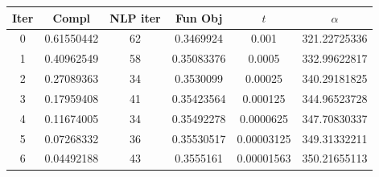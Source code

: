 \begin{tabular}{c c c c c c}
\toprule
Iter & Compl & NLP iter & Fun Obj & $t$ & $\alpha$ \\
\midrule
0 & 0.61550442 & 62 & 0.3469924 & 0.001 & 321.22725336 \\
1 & 0.40962549 & 58 & 0.35083376 & 0.0005 & 332.99622817 \\
2 & 0.27089363 & 34 & 0.3530099 & 0.00025 & 340.29181825 \\
3 & 0.17959408 & 41 & 0.35423564 & 0.000125 & 344.96523728 \\
4 & 0.11674005 & 34 & 0.35492278 & 0.0000625 & 347.70830337 \\
5 & 0.07268332 & 36 & 0.35530517 & 0.00003125 & 349.31332211 \\
6 & 0.04492188 & 43 & 0.3555161 & 0.00001563 & 350.21655113 \\
\bottomrule
\end{tabular}